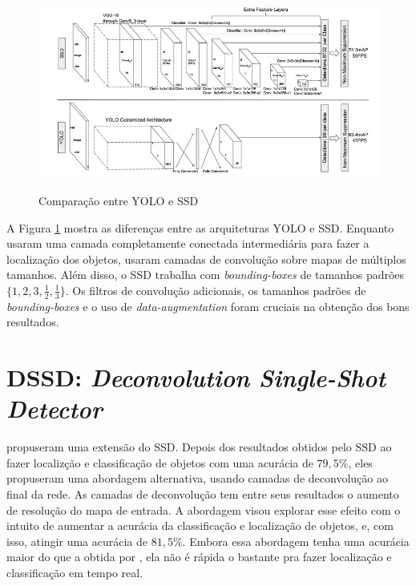   \begin{figure}[H]
	\setlength{\abovecaptionskip}{0pt}
	\setlength{\belowcaptionskip}{0pt}
	\caption[YOLO e SSD]{Comparação entre \ac{YOLO} e \ac{SSD}}
	\centering
	\includegraphics[width=.8\textwidth]{imagem/0x_yoloxssd.JPG}
	\captionsetup{justification=centering}
	\label{fig:yoloxssd}
\end{figure}

A Figura \ref{fig:yoloxssd} mostra as diferenças entre as arquiteturas \ac{YOLO} e \ac{SSD}. Enquanto  usaram uma camada completamente conectada intermediária para fazer a localização dos objetos,  usaram camadas de convolução sobre mapas de múltiplos tamanhos. Além disso, o \ac{SSD} trabalha com \textit{bounding-boxes} de tamanhos padrões $\{1, 2, 3, \frac{1}{2}, \frac{1}{3}\}$. Os filtros de convolução adicionais, os tamanhos padrões de \textit{bounding-boxes} e o uso de \textit{data-augmentation} foram cruciais na obtenção dos bons resultados.

\section{DSSD: \textit{Deconvolution Single-Shot Detector}}

 propuseram uma extensão do \ac{SSD}. Depois dos resultados obtidos pelo \ac{SSD} ao fazer localizção e classificação de objetos com uma acurácia de $79,5\%$, eles propuseram uma abordagem alternativa, usando camadas de deconvolução ao final da rede. As camadas de deconvolução tem entre seus resultados o aumento de resolução do mapa de entrada. A abordagem visou explorar esse efeito com o intuito de aumentar a acurácia da classificação e localização de objetos, e, com isso, atingir uma acurácia de $81,5\%$. Embora essa abordagem tenha uma acurácia maior do que a obtida por , ela não é rápida o bastante pra fazer localização e classificação em tempo real.


